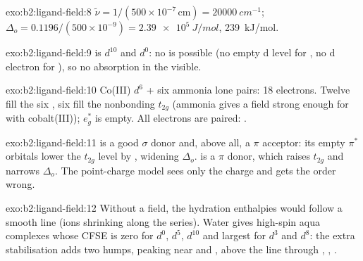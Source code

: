 \begin{solution}{exo:b2:ligand-field:8}
$\tilde\nu = 1/(500 \times 10^{-7}\,\text{cm}) = \qty{20000}{cm^{-1}}$; $\Delta_o =
0.1196/(500 \times 10^{-9}) = \qty{2.39e5}{J/mol}$, \qty{239}{kJ/mol}.
\end{solution}

\begin{solution}{exo:b2:ligand-field:9}
 is $d^{10}$ and  $d^0$: no  is possible (no empty d level
for , no d electron for ), so no absorption in the visible.
\end{solution}

\begin{solution}{exo:b2:ligand-field:10}
Co(III) $d^6$ + six ammonia lone pairs: 18 electrons. Twelve fill the six ,
six fill the nonbonding $t_{2g}$ (ammonia gives a field strong enough for  with
cobalt(III)); $e_g^*$ is empty. All electrons are paired: .
\end{solution}

\begin{solution}{exo:b2:ligand-field:11}
 is a good $\sigma$ donor and, above all, a $\pi$ acceptor: its empty $\pi^*$ orbitals
lower the $t_{2g}$ level by , widening $\Delta_o$.  is a $\pi$ donor, which
raises $t_{2g}$ and narrows $\Delta_o$. The point-charge model sees only the charge and gets the
order wrong.
\end{solution}

\begin{solution}{exo:b2:ligand-field:12}
Without a field, the hydration enthalpies would follow a smooth line (ions shrinking along
the series). Water gives high-spin aqua complexes whose CFSE is zero for $d^0$, $d^5$, $d^{10}$
and largest for $d^3$ and $d^8$: the extra stabilisation adds two humps, peaking near
 and , above the line through , , .
\end{solution}

